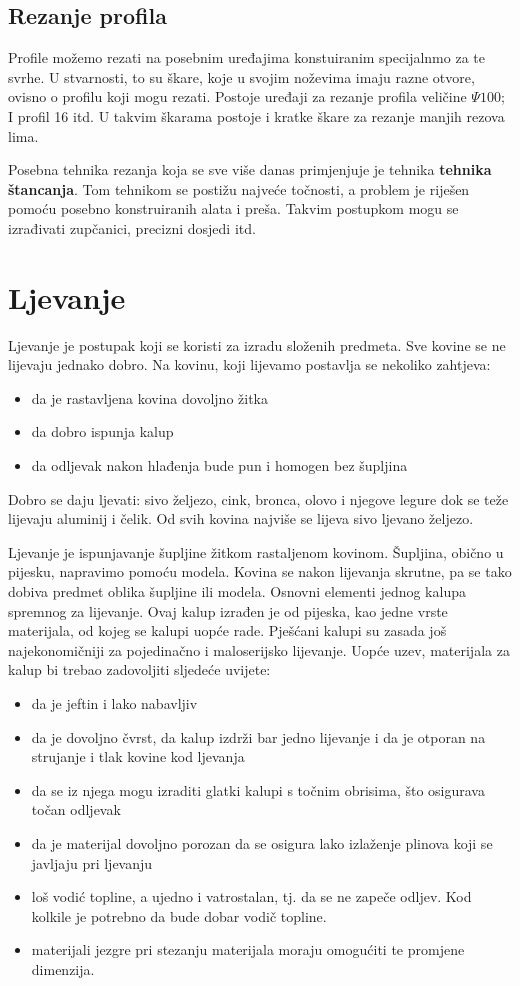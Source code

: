 \documentclass[a4paper,12pt]{article}
\numberwithin{figure}{section}
\begin{document}
\subsection{Rezanje profila}
Profile možemo rezati na posebnim uređajima konstuiranim specijalnmo za te svrhe. U stvarnosti, to su škare, koje u svojim noževima imaju razne otvore, ovisno o profilu koji mogu rezati. Postoje uređaji za rezanje profila veličine $\Psi 100$; I profil 16 itd. U takvim škarama postoje i kratke škare za rezanje manjih rezova lima.\par
Posebna tehnika rezanja koja se sve više danas primjenjuje je tehnika \textbf{tehnika štancanja}. Tom tehnikom se postižu najveće točnosti, a problem je riješen pomoću posebno konstruiranih alata i preša. Takvim postupkom mogu se izrađivati zupčanici, precizni dosjedi itd.
\section{Ljevanje}
Ljevanje je postupak koji se koristi za izradu složenih predmeta. Sve kovine se ne lijevaju jednako dobro. Na kovinu, koji lijevamo postavlja se nekoliko zahtjeva:
\begin{itemize}
\item da je rastavljena kovina dovoljno žitka
\item da dobro ispunja kalup
\item da odljevak nakon hlađenja bude pun i homogen bez šupljina
\end{itemize}
Dobro se daju ljevati: sivo željezo, cink, bronca, olovo i njegove legure dok se teže lijevaju aluminij i čelik. Od svih kovina najviše se lijeva sivo ljevano željezo. \par
Ljevanje je ispunjavanje šupljine žitkom rastaljenom kovinom. Šupljina, obično u pijesku, napravimo pomoću modela. Kovina se nakon lijevanja skrutne, pa se tako dobiva predmet oblika šupljine ili modela.
Osnovni elementi jednog kalupa spremnog za lijevanje. Ovaj kalup izrađen je od pijeska, kao jedne vrste materijala, od kojeg se kalupi uopće rade. Pješćani kalupi su zasada još najekonomičniji za pojedinačno i maloserijsko lijevanje. Uopće uzev, materijala za kalup bi trebao zadovoljiti sljedeće uvijete:
\begin{itemize}
\item da je jeftin i lako nabavljiv
\item da je dovoljno čvrst, da kalup izdrži bar jedno lijevanje i da je otporan na strujanje i tlak kovine kod ljevanja
\item da se iz njega mogu izraditi glatki kalupi s točnim obrisima, što osigurava točan odljevak
\item da je materijal dovoljno porozan da se osigura lako izlaženje plinova koji se javljaju pri ljevanju
\item loš vodić topline, a ujedno i vatrostalan, tj. da se ne zapeče odljev. Kod kolkile je potrebno da bude dobar vodič topline.
\item materijali jezgre pri stezanju materijala moraju omogućiti te promjene dimenzija. 
\end{itemize}
\end{document}
